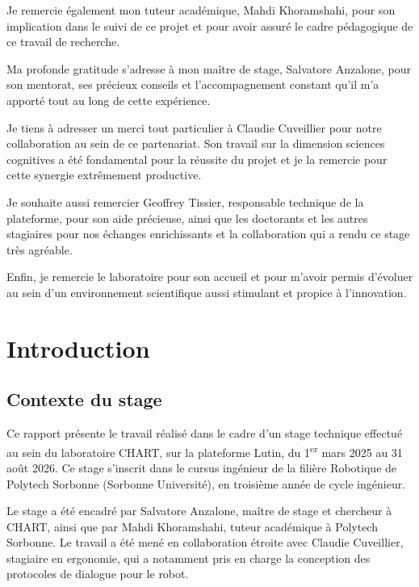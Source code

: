 \documentclass[11pt]{article}
\begin{document}
Je remercie également mon tuteur académique, Mahdi Khoramshahi, pour son implication dans le suivi de ce projet et pour avoir assuré le cadre pédagogique de ce travail de recherche.

Ma profonde gratitude s'adresse à mon maître de stage, Salvatore Anzalone, pour son mentorat, ses précieux conseils et l'accompagnement constant qu'il m'a apporté tout au long de cette expérience.

Je tiens à adresser un merci tout particulier à Claudie Cuveillier pour notre collaboration au sein de ce partenariat. Son travail sur la dimension sciences cognitives a été fondamental pour la réussite du projet et je la remercie pour cette synergie extrêmement productive.

Je souhaite aussi remercier Geoffrey Tissier, responsable technique de la plateforme, pour son aide précieuse, ainsi que les doctorants et les autres stagiaires pour nos échanges enrichissants et la collaboration qui a rendu ce stage très agréable.

Enfin, je remercie le laboratoire pour son accueil et pour m'avoir permis d'évoluer au sein d'un environnement scientifique aussi stimulant et propice à l'innovation.
\newpage

\tableofcontents
\newpage
{}

\listoffigures
\newpage
\listoftables
\newpage

\section{Introduction}

\subsection{Contexte du stage}

Ce rapport présente le travail réalisé dans le cadre d'un stage technique effectué au sein du
laboratoire CHART, sur la plateforme Lutin, du 1\textsuperscript{er} mars 2025 au 31 août 2026.
Ce stage s'inscrit dans le cursus ingénieur de la filière Robotique de Polytech Sorbonne
(Sorbonne Université), en troisième année de cycle ingénieur.

Le stage a été encadré par Salvatore Anzalone, maître de stage et chercheur à CHART, ainsi que
par Mahdi Khoramshahi, tuteur académique à Polytech Sorbonne.
Le travail a été mené en collaboration étroite avec Claudie Cuveillier, stagiaire en ergonomie, qui a notamment pris en charge la conception des protocoles de dialogue pour le robot.
\end{document}

